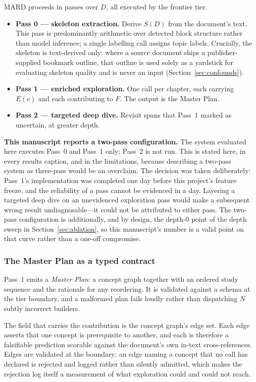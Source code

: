 \documentclass[conference]{IEEEtran}
\begin{document}
MARD proceeds in passes over $D$, all executed by the frontier tier.
\begin{itemize}
  \item \textbf{Pass 0 --- skeleton extraction.} Derive $S(D)$ from the
  document's text. This pass is predominantly arithmetic over detected block
  structure rather than model inference; a single labelling call assigns
  topic labels. Crucially, the skeleton is text-derived only: where a source
  document ships a publisher-supplied bookmark outline, that outline is used
  solely as a yardstick for evaluating skeleton quality and is never an input
  (Section~\ref{sec:confounds}).
  \item \textbf{Pass 1 --- enriched exploration.} One call per chapter, each
  carrying $E(c)$ and each contributing to $F$. The output is the Master Plan.
  \item \textbf{Pass 2 --- targeted deep dive.} Revisit spans that Pass~1
  marked as uncertain, at greater depth.
\end{itemize}

\noindent\textbf{This manuscript reports a two-pass configuration.}
The system evaluated here executes Pass~0 and Pass~1 only; Pass~2 is not run.
This is stated here, in every results caption, and in the limitations,
because describing a two-pass system as three-pass would be an overclaim. The
decision was taken deliberately: Pass~1's implementation was completed one
day before this project's feature freeze, and the reliability of a pass
cannot be evidenced in a day. Layering a targeted deep dive on an unevidenced
exploration pass would make a subsequent wrong result undiagnosable---it
could not be attributed to either pass. The two-pass configuration is
additionally, and by design, the depth-0 point of the depth sweep in
Section~\ref{sec:ablation}, so this manuscript's number is a valid point on
that curve rather than a one-off compromise.

\subsubsection{The Master Plan as a typed contract}
Pass~1 emits a \emph{Master Plan}: a concept graph together with an ordered
study sequence and the rationale for any reordering. It is validated against
a schema at the tier boundary, and a malformed plan fails loudly rather than
dispatching $N$ subtly incorrect builders.

The field that carries the contribution is the concept graph's edge set. Each
edge asserts that one concept is prerequisite to another, and each is
therefore a falsifiable prediction scorable against the document's own
in-text cross-references. Edges are validated at the boundary: an edge naming
a concept that no call has declared is rejected and logged rather than
silently admitted, which makes the rejection log itself a measurement of what
exploration could and could not reach.
\end{document}

